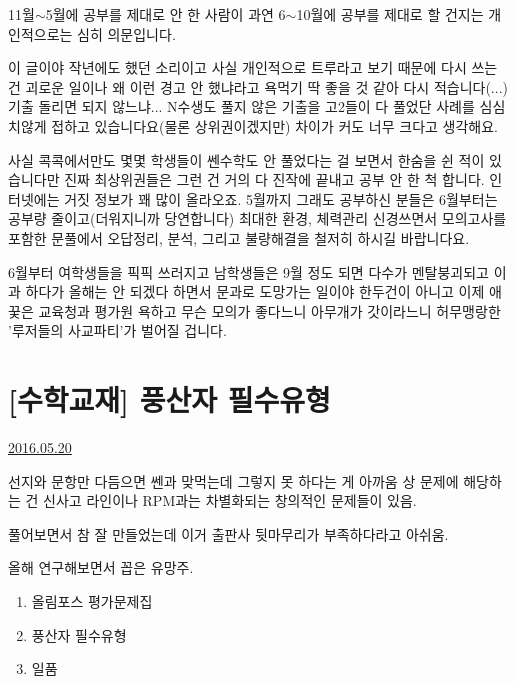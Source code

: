 11월$\sim$5월에 공부를 제대로 안 한 사람이 과연 6$\sim$10월에 공부를 제대로 할 건지는 개인적으로는 심히 의문입니다.
\vspace{5mm}

이 글이야 작년에도 했던 소리이고 사실 개인적으로 트루라고 보기 때문에 다시 쓰는 건 괴로운 일이나
왜 이런 경고 안 했냐라고 욕먹기 딱 좋을 것 같아 다시 적습니다(...)
기출 돌리면 되지 않느냐... N수생도 풀지 않은 기출을 고2들이 다 풀었단 사례를 심심치않게 접하고 있습니다요(물론 상위권이겠지만)
차이가 커도 너무 크다고 생각해요.
\vspace{5mm}

사실 콕콕에서만도 몇몇 학생들이 쎈수학도 안 풀었다는 걸 보면서 한숨을 쉰 적이 있습니다만
진짜 최상위권들은 그런 건 거의 다 진작에 끝내고 공부 안 한 척 합니다. 인터넷에는 거짓 정보가 꽤 많이 올라오죠.
5월까지 그래도 공부하신 분들은 6월부터는 공부량 줄이고(더워지니까 당연합니다) 최대한 환경, 체력관리 신경쓰면서
모의고사를 포함한 문풀에서 오답정리, 분석, 그리고 불량해결을 철저히 하시길 바랍니다요.
\vspace{5mm}

6월부터 여학생들을 픽픽 쓰러지고 남학생들은 9월 정도 되면 다수가 멘탈붕괴되고
이과 하다가 올해는 안 되겠다 하면서 문과로 도망가는 일이야 한두건이 아니고
이제 애꿎은 교육청과 평가원 욕하고 무슨 모의가 좋다느니 아무개가 갓이라느니 허무맹랑한 '루저들의 사교파티'가 벌어질 겁니다.
\vspace{5mm}







\section{[수학교재] 풍산자 필수유형}
\href{https://www.kockoc.com/Apoc/784630}{2016.05.20}

\vspace{5mm}

선지와 문항만 다듬으면 쎈과 맞먹는데 그렇지 못 하다는 게 아까움
상 문제에 해당하는 건 신사고 라인이나 RPM과는 차별화되는 창의적인 문제들이 있음.
\vspace{5mm}

풀어보면서 참 잘 만들었는데 이거 출판사 뒷마무리가 부족하다라고 아쉬움.
\vspace{5mm}

올해 연구해보면서 꼽은 유망주.
\vspace{5mm}

\begin{enumerate}
    \item 올림포스 평가문제집
    \item 풍산자 필수유형
    \item 일품
\end{enumerate}
\vspace{5mm}

